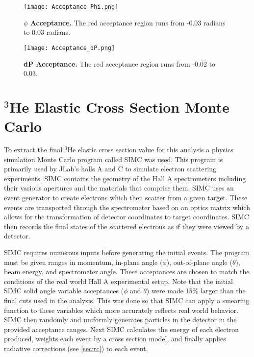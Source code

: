 \begin{figure}[!ht]
\begin{center}
\texttt{[image: Acceptance\_Phi.png]}
\end{center}
\caption[$\phi$ Acceptance]{
{\bf{$\phi$ Acceptance.}} The red acceptance region runs from -0.03 radians to 0.03 radians.}
\label{fig:acceptance_ph}
\end{figure}

\begin{figure}[!ht]
\begin{center}
\texttt{[image: Acceptance\_dP.png]}
\end{center}
\caption[dP Acceptance]{
{\bf{dP Acceptance.}} The red acceptance region runs from -0.02 to 0.03.}
\label{fig:acceptance_dp}
\end{figure}

\section{$^3$He Elastic Cross Section Monte Carlo}
\label{sec:simc}

To extract the final $^3$He elastic cross section value for this analysis a physics simulation Monte Carlo program called SIMC was used. This program is primarily used by JLab's halls A and C to simulate electron scattering experiments. SIMC contains the geometry of the Hall A spectrometers including their various apertures and the materials that comprise them. SIMC uses an event generator to create electrons which then scatter from a given target. These events are transported through the spectrometer based on an optics matrix which allows for the transformation of detector coordinates to target coordinates. SIMC then records the final states of the scattered electrons as if they were viewed by a detector.

SIMC requires numerous inputs before generating the initial events. The program must be given ranges in momentum, in-plane angle ($\phi$), out-of-plane angle ($\theta$), beam energy, and spectrometer angle. These acceptances are chosen to match the conditions of the real world Hall A experimental setup. Note that the initial SIMC solid angle variable acceptances ($\phi$ and $\theta$) were made 15$\%$ larger than the final cuts used in the analysis. This was done so that SIMC can apply a smearing function to these variables which more accurately reflects real world behavior. SIMC then randomly and uniformly generates particles in the detector in the provided acceptance ranges. Next SIMC calculates the energy of each electron produced, weights each event by a cross section model, and finally applies radiative corrections (see \ref{sec:rc}) to each event. 

